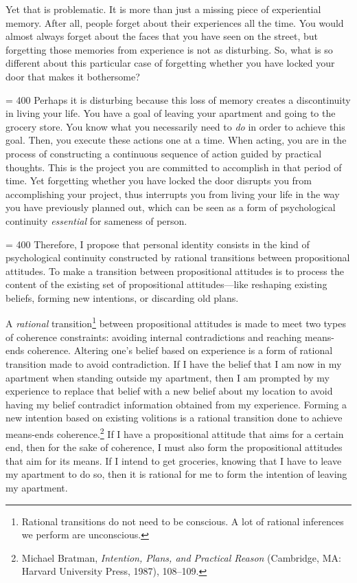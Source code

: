 Yet that is problematic. It is more than just a missing piece of
experiential memory. After all, people forget about their experiences
all the time. You would almost always forget about the faces that you have
seen on the street, but forgetting those memories from experience is not
as disturbing. So, what is so different about this particular case of
forgetting whether you have locked your door that makes it bothersome?

\pretolerance = 400
Perhaps it is disturbing because this loss of memory creates a
discontinuity in living your life. You have a goal of leaving your
apartment and going to the grocery store. You know what you necessarily
need to \emph{do} in order to achieve this goal. Then, you execute these
actions one at a time. When acting, you are in the process of
constructing a continuous sequence of action guided by practical
thoughts. This is the project you are committed to accomplish in that
period of time. Yet forgetting whether you have locked the door disrupts
you from accomplishing your project, thus interrupts you from living
your life in the way you have previously planned out, which can be seen
as a form of psychological continuity \emph{essential} for sameness of
person.

\pretolerance = 400
Therefore, I propose that personal identity consists in the kind of
psychological continuity constructed by rational transitions between
propositional attitudes. To make a transition between propositional
attitudes is to process the content of the existing set of propositional
attitudes---like reshaping existing beliefs, forming new intentions, or
discarding old plans.

A \emph{rational} transition\footnote{Rational transitions do not need
  to be conscious. A lot of rational inferences we perform are
  unconscious.} between propositional attitudes is made to meet two
types of coherence constraints: avoiding internal contradictions and
reaching means-ends coherence. Altering one's belief based on experience
is a form of rational transition made to avoid contradiction. If I have
the belief that I am now in my apartment when standing outside my
apartment, then I am prompted by my experience to replace that belief
with a new belief about my location to avoid having my belief contradict
information obtained from my experience. Forming a new intention based
on existing volitions is a rational transition done to achieve
means-ends coherence.\footnote{Michael Bratman, \emph{Intention, Plans,
  and Practical Reason} (Cambridge, MA: Harvard University Press, 1987),
  108--109.} If I have a propositional attitude that aims for a certain
end, then for the sake of coherence, I must also form the propositional
attitudes that aim for its means. If I intend to get groceries, knowing
that I have to leave my apartment to do so, then it is rational for me
to form the intention of leaving my apartment.


